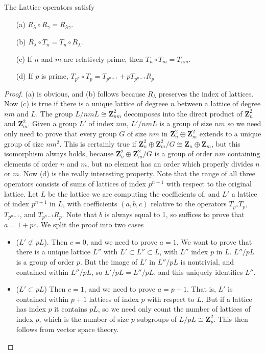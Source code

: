 \begin{theorem}
The Lattice operators satisfy
\begin{enumerate}
    \item[(a)] $R_\lambda \circ R_\gamma = R_{\lambda \gamma}$.
    \item[(b)] $R_\lambda \circ T_n = T_n \circ R_\lambda$.
    \item[(c)] If $n$ and $m$ are relatively prime, then $T_n \circ T_m = T_{nm}$.
    \item[(d)] If $p$ is prime, $T_{p^n} \circ T_p = T_{p^{n+1}} + p T_{p^{n-1}} R_p$
\end{enumerate}
\end{theorem}
\begin{proof}
    (a) is obvious, and (b) follows because $R_\lambda$ preserves the index of lattices. Now (c) is true if there is a unique lattice of degreee $n$ between a lattice of degree $nm$ and $L$. The group $L/nmL \cong \mathbf{Z}^2_{nm}$ decomposes into the direct product of $\mathbf{Z}^2_n$ and $\mathbf{Z}^2_m$. Given a group $L'$ of index $nm$, $L'/nmL$ is a group of size $nm$ so we need only need to prove that every group $G$ of size $nm$ in $\mathbf{Z}^2_n \oplus \mathbf{Z}^2_m$ extends to a unique group of size $nm^2$. This is certainly true if $\mathbf{Z}_n^2 \oplus \mathbf{Z}_m^2 / G \cong \mathbf{Z}_n \oplus \mathbf{Z}_m$, but this isomorphism always holds, because $\mathbf{Z}_n^2 \oplus \mathbf{Z}_m^2 / G$ is a group of order $nm$ containing elements of order $n$ and $m$, but no element has an order which properly divides $n$ or $m$. Now (d) is the really interesting property. Note that the range of all three operators consists of sums of lattices of index $p^{n+1}$ with respect to the original lattice. Let $L$ be the lattice we are computing the coefficients of, and $L'$ a lattice of index $p^{n+1}$ in $L$, with coefficients $(a,b,c)$ relative to the operators $T_{p^n} T_p$, $T_{p^{n+1}}$, and $T_{p^{n-1}} R_p$. Note that $b$ is always equal to 1, so suffices to prove that $a = 1 + pc$. We split the proof into two cases
    \begin{itemize}
        \item ($L' \not \subset pL$). Then $c = 0$, and we need to prove $a = 1$. We want to prove that there is a unique lattice $L''$ with $L' \subset L'' \subset L$, with $L''$ index $p$ in $L$. $L''/pL$ is a group of order $p$. But the image of $L'$ in $L''/pL$ is nontrivial, and contained within $L''/pL$, so $L'/pL = L''/pL$, and this uniquely identifies $L''$.
        \item ($L' \subset pL$) Then $c = 1$, and we need to prove $a = p + 1$. That is, $L'$ is contained within $p + 1$ lattices of index $p$ with respect to $L$. But if a lattice has index $p$ it contains $pL$, so we need only count the number of lattices of index $p$, which is the number of size $p$ subgroups of $L/pL \cong \mathbf{Z}_p^2$. This then follows from vector space theory.
    \end{itemize}
\end{proof}

